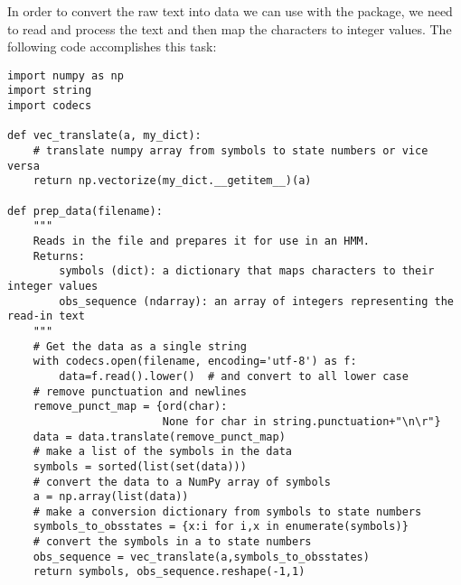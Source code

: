 In order to convert the raw text into data we can use with the  package, we need to read and process the text and then map the characters to integer values.
The following code accomplishes this task:
\begin{lstlisting}
import numpy as np
import string
import codecs

def vec_translate(a, my_dict):
    # translate numpy array from symbols to state numbers or vice versa
    return np.vectorize(my_dict.__getitem__)(a)

def prep_data(filename):
    """
    Reads in the file and prepares it for use in an HMM.
    Returns:
        symbols (dict): a dictionary that maps characters to their integer values
        obs_sequence (ndarray): an array of integers representing the read-in text
    """
    # Get the data as a single string
    with codecs.open(filename, encoding='utf-8') as f:
        data=f.read().lower()  # and convert to all lower case
    # remove punctuation and newlines
    remove_punct_map = {ord(char): 
                        None for char in string.punctuation+"\n\r"}
    data = data.translate(remove_punct_map)
    # make a list of the symbols in the data
    symbols = sorted(list(set(data)))
    # convert the data to a NumPy array of symbols
    a = np.array(list(data))
    # make a conversion dictionary from symbols to state numbers
    symbols_to_obsstates = {x:i for i,x in enumerate(symbols)}
    # convert the symbols in a to state numbers
    obs_sequence = vec_translate(a,symbols_to_obsstates)
    return symbols, obs_sequence.reshape(-1,1)
\end{lstlisting}

